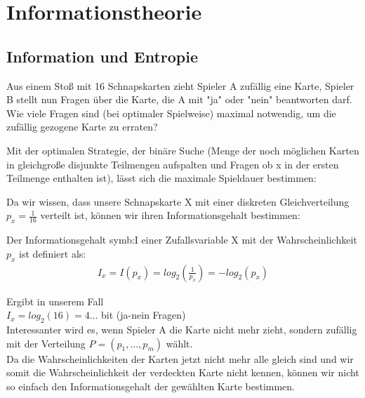 \chapter{Informationstheorie}
\section{Information und Entropie}

\begin{bsp}Aus einem Stoß mit 16 Schnapskarten zieht Spieler A zufällig eine Karte, 
Spieler B stellt nun Fragen über die Karte, die A mit "ja" oder "nein" beantworten darf.\\
Wie viele Fragen sind (bei optimaler Spielweise) maximal notwendig, um die zufällig gezogene Karte zu erraten?
\end{bsp}

Mit der optimalen Strategie, der binäre Suche (Menge der noch möglichen Karten in gleichgroße disjunkte Teilmengen aufspalten und Fragen ob x in der ersten Teilmenge enthalten ist), lässt sich die maximale Spieldauer bestimmen:

Da wir wissen, dass unsere Schnapskarte X mit einer diskreten Gleichverteilung $p_x = \frac{1}{16}$ verteilt ist, können wir ihren Informationsgehalt bestimmen:
\begin{definition}[Informationsgehalt]
Der Informationsgehalt \gls{symb:I} einer Zufallsvariable X mit der Wahrscheinlichkeit $p_x$ ist definiert als:\\
\begin{align}
I_x = I(p_x) = log_2(\frac{1}{p_x}) = - log_2(p_x)
\end{align}

\end{definition}
Ergibt in unserem Fall\\
$I_x = log_2(16) = 4 \dots $ bit (ja-nein Fragen)\\

Interessanter wird es, wenn Spieler A die Karte nicht mehr zieht, sondern zufällig mit der Verteilung $P=(p_1,\dots, p_m)$
wählt.\\
Da die Wahrscheinlichkeiten der Karten jetzt nicht mehr alle gleich sind und wir somit die Wahrscheinlichkeit der verdeckten Karte nicht kennen, können wir nicht so einfach den Informationsgehalt der gewählten Karte bestimmen.\\


